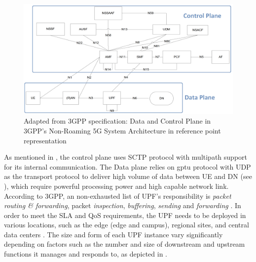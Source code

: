 \begin{figure}[H]
	\centering
	\includegraphics[width=1.0\textwidth]{resources/images/Non_Roaming_5G_System_Architecture_in_reference_point_representation.png}
	\caption{Adapted from 3GPP specification: Data and Control Plane in 3GPP's Non-Roaming 5G System Architecture in reference point representation \cite{3gpp_5g_system_architect_spec_release_18}}
	\label{fig:related_work:Non_Roaming_5G_System_Architecture_in_reference_point_representation}
\end{figure}

As mentioned in , the control plane uses \ac{SCTP} protocol with multipath support for its internal communication.
The Data plane relies on \ac{gptu} protocol with \ac{UDP} as the transport protocol to deliver high volume of data between \ac{UE} and \ac{DN} (see ), which require powerful processing power and high capable network link.
According to \ac{3GPP}, an non-exhausted list of \ac{UPF}'s responsibility is \textit{packet routing \& forwarding}, packet \textit{inspection}, \textit{buffering}, \textit{sending} and \textit{forwarding} \cite{3gpp_5g_system_architect_spec_release_18}.
In order to meet the \ac{SLA} and \ac{QoS} requirements, the \ac{UPF} needs to be deployed in various locations, such as the edge (edge and campus), regional sites, and central data centers \cite{zte_upf_full_whitepaper}. 
The size and form of each \ac{UPF} instance vary significantly depending on factors such as the number and size of downstream and upstream functions it manages and responds to, as depicted in .

